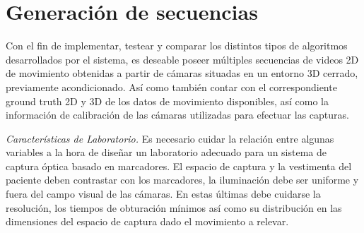 \section{Generación de secuencias} 
\label{section_base_de_datos}
Con el fin de implementar, testear y comparar los distintos tipos de algoritmos desarrollados por el sistema, es deseable poseer  múltiples secuencias de videos 2D de movimiento obtenidas a partir de cámaras situadas en un entorno 3D cerrado, previamente acondicionado. Así como también contar con el correspondiente ground truth 2D y 3D de los datos de movimiento disponibles, así como la información de calibración de las cámaras utilizadas para efectuar las capturas.

\textit{Características de Laboratorio.}
\label{seccion_Caracteristicas_Laboratorio}
Es necesario cuidar la relación entre algunas variables a la hora de diseñar un laboratorio adecuado para un sistema de captura óptica basado en marcadores. El espacio de captura y la vestimenta del paciente deben contrastar con los marcadores, la iluminación debe ser uniforme y fuera del campo visual de las cámaras. En estas últimas debe cuidarse la resolución, los tiempos de obturación mínimos así como su distribución en las dimensiones del espacio de captura dado el movimiento a relevar.
%

